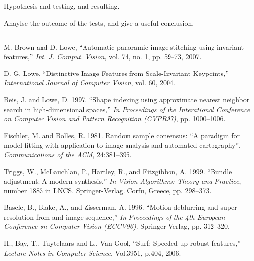 \documentclass[10pt,twocolumn,letterpaper]{article}
\begin{document}
Hypothesis and testing, and resulting.

Anaylse the outcome of the tests, and give a useful conclusion.

\subsection{}


\begin{thebibliography}{9}
M. Brown and D. Lowe, ``Automatic panoramic image stitching using invariant features,''
\textit{Int. J. Comput. Vision}, vol. 74, no. 1, pp. 59–73, 2007.

D. G. Lowe, ``Distinctive Image Features from Scale-Invariant Keypoints,''
\textit{International Journal of Computer Vision}, vol. 60, 2004.

Beis, J. and Lowe, D. 1997. ``Shape indexing using approximate nearest neighbor search in high-dimensional spaces,''
\textit{In Proceedings of the Interational Conference on Computer Vision and Pattern Recognition (CVPR97)}, pp. 1000–1006.

Fischler, M. and Bolles, R. 1981. Random sample consensus: ``A paradigm for model fitting with application to image analysis and automated cartography'',
\textit{Communications of the ACM}, 24:381–395.

Triggs, W., McLauchlan, P., Hartley, R., and Fitzgibbon, A. 1999. ``Bundle adjustment: A modern synthesis,''
\textit{In Vision Algorithms: Theory and Practice}, number 1883 in LNCS. Springer-Verlag. Corfu, Greece, pp. 298–373.

Bascle, B., Blake, A., and Zisserman, A. 1996. ``Motion deblurring and super-resolution from and image sequence,''
\textit{In Proceedings of the 4th European Conference on Computer Vision (ECCV96)}. Springer-Verlag, pp. 312–320.

H., Bay, T., Tuytelaars and L., Van Gool, ``Surf: Speeded up robust features,''
\textit{Lecture Notes in Computer Science}, Vol.3951, p.404, 2006.

\end{thebibliography}
\end{document}
